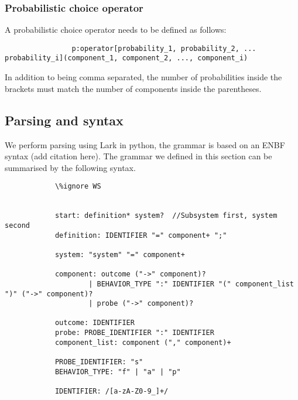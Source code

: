         \subsubsection{Probabilistic choice operator}
            A probabilistic choice operator needs to be defined as follows:
            \begin{verbatim}
                p:operator[probability_1, probability_2, ... probability_i](component_1, component_2, ..., component_i) 
            \end{verbatim}
            In addition to being comma separated, the number of probabilities inside the brackets must match the number of components inside the parentheses. 
    
    \subsection{Parsing and syntax}
        We perform parsing using Lark in python, the grammar is based on an ENBF syntax (add citation here). 
        The grammar we defined in this section can be summarised by the following syntax.
        \begin{verbatim}
            \%ignore WS


            start: definition* system?  //Subsystem first, system second
            definition: IDENTIFIER "=" component+ ";"

            system: "system" "=" component+

            component: outcome ("->" component)?  
                    | BEHAVIOR_TYPE ":" IDENTIFIER "(" component_list ")" ("->" component)?  
                    | probe ("->" component)?

            outcome: IDENTIFIER
            probe: PROBE_IDENTIFIER ":" IDENTIFIER 
            component_list: component ("," component)+

            PROBE_IDENTIFIER: "s"
            BEHAVIOR_TYPE: "f" | "a" | "p"

            IDENTIFIER: /[a-zA-Z0-9_]+/
                        
        \end{verbatim}
